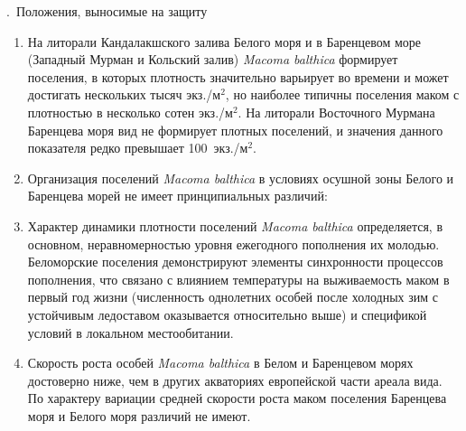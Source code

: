 \documentclass[aspectratio=169, xcolor=table]{beamer}
\begin{document}
\begin{frame}{\insertpagenumber.\ Положения, выносимые на защиту}
\begin{scriptsize}

\begin{enumerate}
\item На литорали Кандалакшского залива Белого моря и в Баренцевом море (Западный Мурман и Кольский залив) \textit{Macoma balthica} формирует поселения, в которых плотность значительно варьирует во времени и может достигать нескольких тысяч экз./м$^2$, но наиболее типичны поселения маком с плотностью в несколько сотен экз./м$^2$. На литорали Восточного Мурмана Баренцева моря вид не формирует плотных поселений, и значения данного показателя редко превышает 100~экз./м$^2$.

\item Организация поселений  \textit{Macoma balthica} в условиях осушной зоны Белого и Баренцева морей не имеет принципиальных различий:
	\begin{itemize}
	\end{itemize}

\item Характер динамики плотности поселений \textit{Macoma balthica} определяется, в основном, неравномерностью  уровня ежегодного пополнения их молодью. 
Беломорские поселения демонстрируют элементы синхронности процессов пополнения, что связано с влиянием температуры на выживаемость маком в первый год жизни  (численность однолетних особей после холодных зим с устойчивым ледоставом оказывается относительно выше) и спецификой условий в локальном местообитании.

\item Скорость роста особей \textit{Macoma balthica} в Белом и Баренцевом морях достоверно ниже, чем в других акваториях европейской части ареала вида. 
По характеру вариации средней скорости роста маком поселения Баренцева моря и Белого моря различий не имеют. 
\end{enumerate}
\end{scriptsize}
\end{frame}
\end{document}
